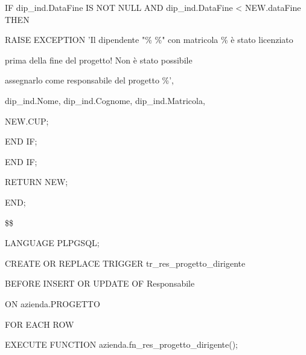 \begin{flushleft}
\begin{description}
\begin{description}
                    \newpage

                    \begin{description}
                        \item IF dip\_ind.DataFine IS NOT NULL AND dip\_ind.DataFine < NEW.dataFine THEN
                        \vspace{0.2cm}
                        \begin{description}
                            \item RAISE EXCEPTION 'Il dipendente "\% \%" con matricola \% è stato licenziato
                            \item \hspace{3cm}prima della fine del progetto! Non è stato possibile
                            \item \hspace{3cm}assegnarlo come responsabile del progetto \%',
                            \item \hspace{3cm}dip\_ind.Nome, dip\_ind.Cognome, dip\_ind.Matricola,
                            \item \hspace{3cm}NEW.CUP;
                        \end{description}
                        \item END IF;
                    \end{description}
                    \item END IF;
                    \item 
                    \item RETURN NEW;
                \end{description}
                \item END;
                \item \$\$
                \item LANGUAGE PLPGSQL;
            \end{description}
        \end{flushleft}
    \normalfont

    \ttfamily
        \begin{flushleft}
            \begin{description}
                \item CREATE OR REPLACE TRIGGER tr\_res\_progetto\_dirigente
                \item BEFORE INSERT OR UPDATE OF Responsabile
                \item ON azienda.PROGETTO
                \item FOR EACH ROW
                \item EXECUTE FUNCTION azienda.fn\_res\_progetto\_dirigente();
            \end{description}
        \end{flushleft}
    \normalfont


